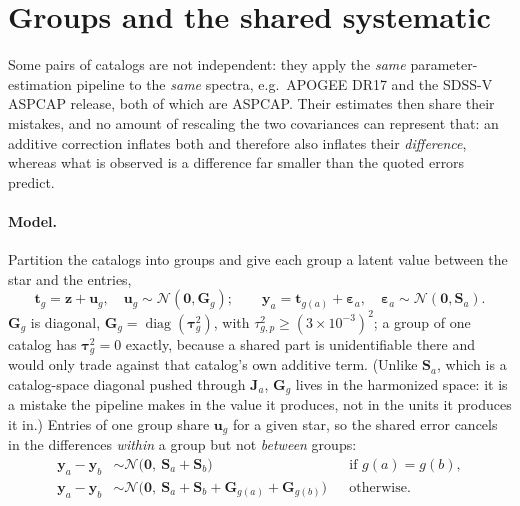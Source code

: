 \documentclass[11pt,a4paper]{article}
\newcommand{\bv}[1]{\boldsymbol{#1}}          %
\newcommand{\bM}[1]{\boldsymbol{#1}}          %
\newcommand{\diag}{\operatorname{diag}}
\newcommand{\N}{\mathcal{N}}
\begin{document}
\section{Groups and the shared systematic}
\label{sec:groups}

Some pairs of catalogs are not independent: they apply the \emph{same}
parameter-estimation pipeline to the \emph{same} spectra, e.g.\ APOGEE DR17 and
the SDSS-V ASPCAP release, both of which are ASPCAP. Their estimates then share
their mistakes, and no amount of rescaling the two covariances can represent
that: an additive correction inflates both and therefore also inflates their
\emph{difference}, whereas what is observed is a difference far smaller than the
quoted errors predict.

\paragraph{Model.} Partition the catalogs into groups and give each group a
latent value between the star and the entries,
\begin{equation}
  \bv t_g = \bv z + \bv u_g, \quad \bv u_g \sim \N(\bv 0, \bM G_g); \qquad
  \bv y_a = \bv t_{g(a)} + \bv\varepsilon_a, \quad \bv\varepsilon_a \sim \N(\bv 0, \bM S_a).
\end{equation}
$\bM G_g$ is diagonal, $\bM G_g = \diag(\bv\tau_g^2)$, with
$\tau^2_{g,p} \ge (3\times 10^{-3})^2$; a group of one catalog has
$\bv\tau_g^2 = 0$ exactly, because a shared part is unidentifiable there and would
only trade against that catalog's own additive term. (Unlike $\bM S_a$, which is a
catalog-space diagonal pushed through $\bM J_a$, $\bM G_g$ lives in the harmonized
space: it is a mistake the pipeline makes in the value it produces, not in the
units it produces it in.)
Entries of one group share $\bv u_g$ for a given star, so the shared error
cancels in the differences \emph{within} a group but not \emph{between} groups:
\begin{align}
  \bv y_a-\bv y_b &\sim \N\big(\bv 0,\ \bM S_a+\bM S_b\big)
  && \text{if } g(a)=g(b),\\
  \bv y_a-\bv y_b &\sim \N\big(\bv 0,\ \bM S_a+\bM S_b+\bM G_{g(a)}+\bM G_{g(b)}\big)
  && \text{otherwise.}
\end{align}
\end{document}
